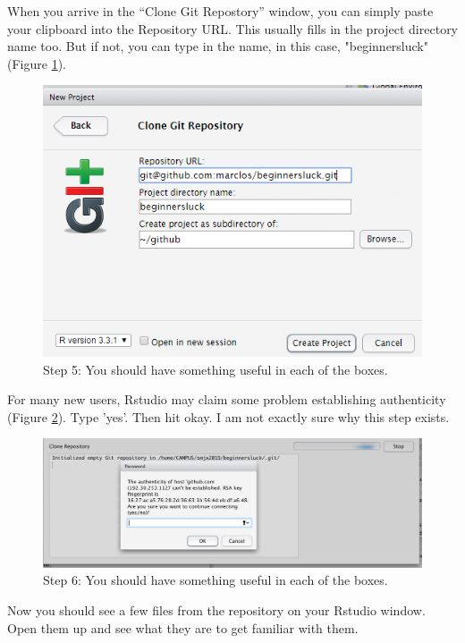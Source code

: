 \documentclass[12pt]{../SOP3_beta}
\begin{document}
When you arrive in the ``Clone Git Repostory'' window, you can simply paste your clipboard into the Repository URL. This usually fills in the project directory name too. But if not, you can type in the name, in this case, "beginnersluck" (Figure \ref{fig:step5}).

\begin{figure}[H]
\includegraphics{graphics/RstudioNewProject3.jpg}
\caption{Step 5: You should have something useful in each of the boxes.}
\label{fig:step5}
\end{figure}

\NP For many new users, Rstudio may claim some problem establishing authenticity (Figure \ref{fig:step6}). Type 'yes'. Then hit okay. I am not exactly sure why this step exists. 

\begin{figure}[H]
\includegraphics{graphics/Authenticity.jpg}
\caption{Step 6: You should have something useful in each of the boxes.}
\label{fig:step6}
\end{figure}


\NP Now you should see a few files from the repository on your Rstudio window. Open them up and see what they are to get familiar with them.
\end{document}
